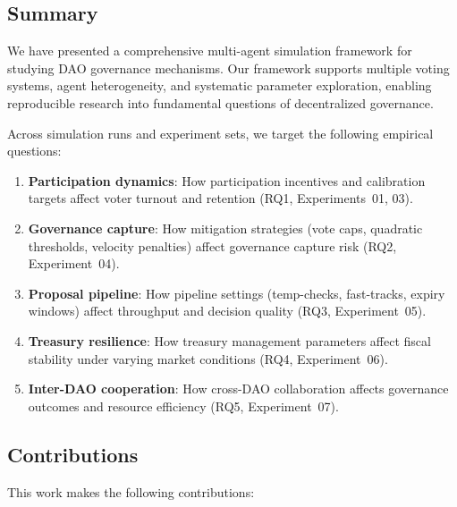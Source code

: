 
\subsection{Summary}

We have presented a comprehensive multi-agent simulation framework for studying DAO governance mechanisms. Our framework supports multiple voting systems, agent heterogeneity, and systematic parameter exploration, enabling reproducible research into fundamental questions of decentralized governance.

Across \totalruns{} simulation runs and \experimentcount{} experiment sets, we target the following empirical questions:

\begin{enumerate}
    \item \textbf{Participation dynamics}: How participation incentives and calibration targets affect voter turnout and retention (RQ1, Experiments~01, 03).

    \item \textbf{Governance capture}: How mitigation strategies (vote caps, quadratic thresholds, velocity penalties) affect governance capture risk (RQ2, Experiment~04).

    \item \textbf{Proposal pipeline}: How pipeline settings (temp-checks, fast-tracks, expiry windows) affect throughput and decision quality (RQ3, Experiment~05).

    \item \textbf{Treasury resilience}: How treasury management parameters affect fiscal stability under varying market conditions (RQ4, Experiment~06).

    \item \textbf{Inter-DAO cooperation}: How cross-DAO collaboration affects governance outcomes and resource efficiency (RQ5, Experiment~07).
\end{enumerate}

\subsection{Contributions}

This work makes the following contributions:


